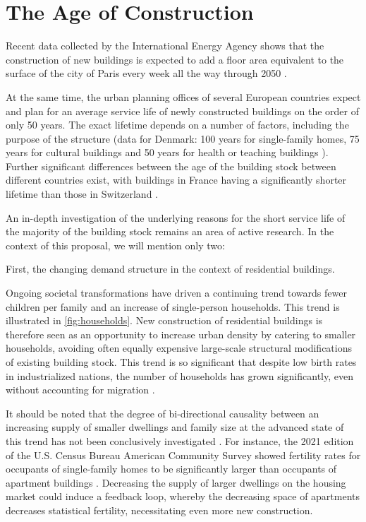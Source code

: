 \documentclass{article}
\begin{document}
\clearpage
\section{The Age of Construction}
\label{sec:construction}

\begin{multicols}{2}

Recent data collected by the International Energy Agency shows that the construction of new buildings is expected to add a floor area equivalent to the surface of the city of Paris every week all the way through 2050 \cite[Sec. 3.7]{cozzi_net_2021}.

At the same time, the urban planning offices of several European countries expect and plan for an average service life of newly constructed buildings on the order of only 50 years. The exact lifetime depends on a number of factors, including the purpose of the structure (data for Denmark: 100 years for single-family homes, 75 years for cultural buildings and 50 years for health or teaching buildings \cite{andersen_lifespan_2023}). Further significant differences between the age of the building stock between different countries exist, with buildings in France having a significantly shorter lifetime \cite{noauthor_value_2013} than those in Switzerland \cite{kornmann_service_2012}.

An in-depth investigation of the underlying reasons for the short service life of the majority of the building stock remains an area of active research. In the context of this proposal, we will mention only two:

First, the changing demand structure in the context of residential buildings.

Ongoing societal transformations have driven a continuing trend towards fewer children per family and an increase of single-person households. This trend is illustrated in \cref{fig:households}. New construction of residential buildings is therefore seen as an opportunity to increase urban density by catering to smaller households, avoiding often equally expensive large-scale structural modifications of existing building stock. This trend is so significant that despite low birth rates in industrialized nations, the number of households has grown significantly, even without accounting for migration \cite{noauthor_why_2014}.

It should be noted that the degree of bi-directional causality between an increasing supply of smaller dwellings and family size at the advanced state of this trend has not been conclusively investigated \cite{kulu_fertility_2007}. For instance, the 2021 edition of the U.S. Census Bureau American Community Survey showed fertility rates for occupants of single-family homes to be significantly larger than occupants of apartment buildings \cite{noauthor_american_2021}. Decreasing the supply of larger dwellings on the housing market could induce a feedback loop, whereby the decreasing space of apartments decreases statistical fertility, necessitating even more new construction.

\end{multicols}
\end{document}
